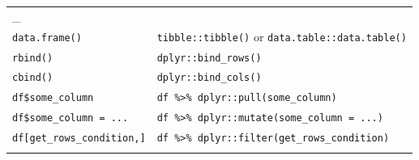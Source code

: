 \documentclass[]{book}
\begin{document}
\begin{longtable}[]{@{}ll@{}}
\begin{minipage}[t]{0.05\columnwidth}
\_\strut
\end{minipage}\tabularnewline
\begin{minipage}[t]{0.05\columnwidth}\raggedright\strut
\texttt{data.frame()}\strut
\end{minipage} & \begin{minipage}[t]{0.05\columnwidth}\raggedright\strut
\texttt{tibble::tibble()} or \texttt{data.table::data.table()}\strut
\end{minipage}\tabularnewline
\begin{minipage}[t]{0.05\columnwidth}\raggedright\strut
\texttt{rbind()}\strut
\end{minipage} & \begin{minipage}[t]{0.05\columnwidth}\raggedright\strut
\texttt{dplyr::bind\_rows()}\strut
\end{minipage}\tabularnewline
\begin{minipage}[t]{0.05\columnwidth}\raggedright\strut
\texttt{cbind()}\strut
\end{minipage} & \begin{minipage}[t]{0.05\columnwidth}\raggedright\strut
\texttt{dplyr::bind\_cols()}\strut
\end{minipage}\tabularnewline
\begin{minipage}[t]{0.05\columnwidth}\raggedright\strut
\texttt{df\$some\_column}\strut
\end{minipage} & \begin{minipage}[t]{0.05\columnwidth}\raggedright\strut
\texttt{df\ \%\textgreater{}\%\ dplyr::pull(some\_column)}\strut
\end{minipage}\tabularnewline
\begin{minipage}[t]{0.05\columnwidth}\raggedright\strut
\texttt{df\$some\_column\ =\ ...}\strut
\end{minipage} & \begin{minipage}[t]{0.05\columnwidth}\raggedright\strut
\texttt{df\ \%\textgreater{}\%\ dplyr::mutate(some\_column\ =\ ...)}\strut
\end{minipage}\tabularnewline
\begin{minipage}[t]{0.05\columnwidth}\raggedright\strut
\texttt{df{[}get\_rows\_condition,{]}}\strut
\end{minipage} & \begin{minipage}[t]{0.05\columnwidth}\raggedright\strut
\texttt{df\ \%\textgreater{}\%\ dplyr::filter(get\_rows\_condition)}\strut
\end{minipage}\tabularnewline
\begin{minipage}[t]{0.05\columnwidth}\raggedright\strut

\end{minipage}
\end{longtable}
\end{document}
